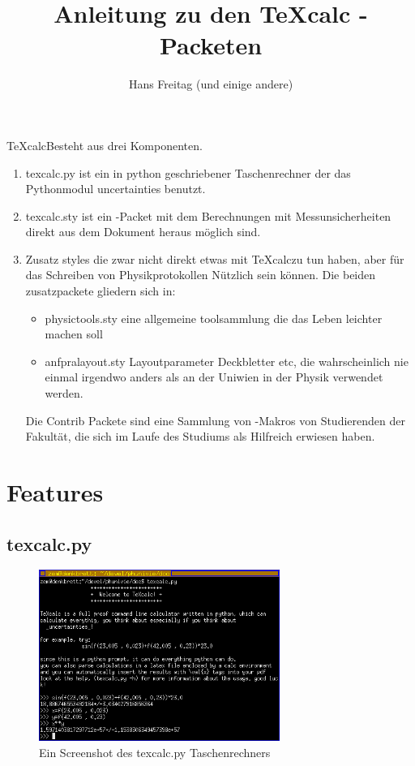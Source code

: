 \documentclass[a4paper]{article}
\newcommand{\texcalc}{{\TeX}calc}
\begin{document}
\title{Anleitung zu den {\TeX}calc \LaTeXe-Packeten}
\author{Hans Freitag (und einige andere)}
\maketitle 

\texcalc Besteht aus drei Komponenten. 

\begin{enumerate}
\item texcalc.py ist ein in python geschriebener Taschenrechner der das Pythonmodul 
		uncertainties benutzt.
\item texcalc.sty ist ein \LaTeXe-Packet mit dem Berechnungen mit Messunsicherheiten 
		direkt aus dem \LaTeXe Dokument heraus möglich sind. 
\item Zusatz styles die zwar nicht direkt etwas mit \texcalc zu tun haben, aber für 
		das Schreiben von Physikprotokollen Nützlich sein können. Die beiden zusatzpackete 
		gliedern sich in:
	\begin{itemize}
	\item physictools.sty eine allgemeine toolsammlung die das Leben leichter machen soll
	\item anfpralayout.sty Layoutparameter Deckbletter etc, die wahrscheinlich nie einmal 
		irgendwo anders als an der Uniwien in der Physik verwendet werden. 
	\end{itemize}
	Die Contrib Packete sind eine Sammlung von \LaTeXe-Makros von Studierenden der Fakultät, 
	die sich im Laufe des Studiums als Hilfreich erwiesen haben. 
\end{enumerate}


\tableofcontents

\section{Features}

\subsection{texcalc.py}

\begin{figure}[h]
\centering
\includegraphics[width=0.7\textwidth]{texcalc.png}
\caption{Ein Screenshot des texcalc.py Taschenrechners}
\label{fig:texcalc.py}
\end{figure}
\end{document}
